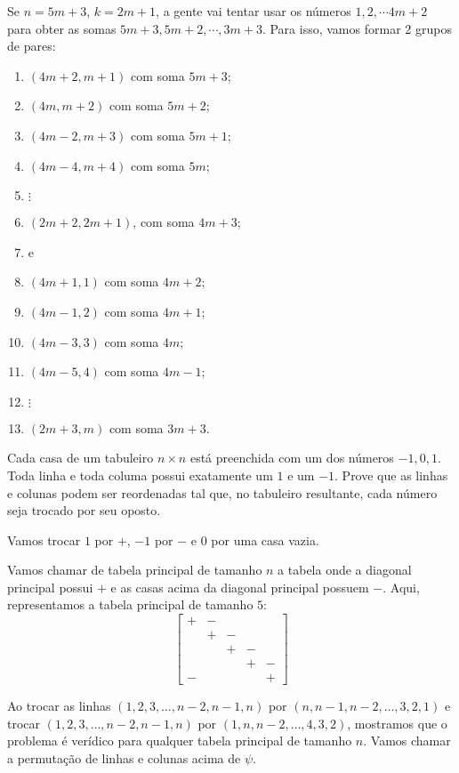 \documentclass[11pt, a4paper]{article}
\begin{document}
	Se $n = 5m + 3$, $k = 2m + 1$, a gente vai tentar usar os números $1, 2, \cdots 4m + 2$ para obter as somas $5m + 3, 5m + 2, \cdots, 3m+3$. Para isso, vamos formar 2 grupos de pares:
\begin{enumerate}[label = \textbullet]
	\item $(4m + 2, m+1)$ com soma $5m + 3$;
	\item $(4m, m+2)$ com soma $5m + 2$;
	\item $(4m - 2, m+3)$ com soma $5m + 1$;
	\item $(4m - 4, m+4)$ com soma $5m$;
	\item[] $\vdots$
	\item $(2m + 2, 2m+1)$, com soma $4m + 3$;
	\item[] e
	\item $(4m + 1, 1)$ com soma $4m + 2$;
	\item $(4m - 1, 2)$ com soma $4m + 1$;
	\item $(4m - 3, 3)$ com soma $4m$;
	\item $(4m - 5, 4)$ com soma $4m - 1$;
	\item[] $\vdots$
	\item $(2m+3, m)$ com soma $3m+3$.
\end{enumerate}

	\newpage

	\setcounter{prob}{1}
	\begin{prob}[Irã 1997-98]
		Cada casa de um tabuleiro $n\times n$ está preenchida com um dos números $-1, 0, 1$. Toda linha e toda columa possui exatamente um $1$ e um $-1$. Prove que as linhas e colunas podem ser reordenadas tal que, no tabuleiro resultante, cada número seja trocado por seu oposto. 
	\end{prob}

	Vamos trocar $1$ por $+$, $-1$ por $-$ e $0$ por uma casa vazia.

	Vamos chamar de tabela principal de tamanho $n$ a tabela onde a diagonal principal possui $+$ e as casas acima da diagonal principal possuem $-$. Aqui, representamos a tabela principal de tamanho $5$:	
	\[
	 \begin{bmatrix}
		 + & - &   &   &   \\
		   & + & - &   &   \\
		   &   & + & - &   \\
		   &   &   & + & - \\
		 - &   &   &   & + 
	\end{bmatrix}
	\]

	Ao trocar as linhas $(1, 2, 3, \dots, n-2, n-1, n)$ por $(n, n-1, n-2, \dots, 3, 2, 1)$ e trocar $(1, 2, 3, \dots, n-2, n-1, n)$ por $(1, n, n-2, \dots, 4, 3, 2)$, mostramos que o problema é verídico para qualquer tabela principal de tamanho $n$. Vamos chamar a permutação de linhas e colunas acima de $\psi$.
\end{document}
